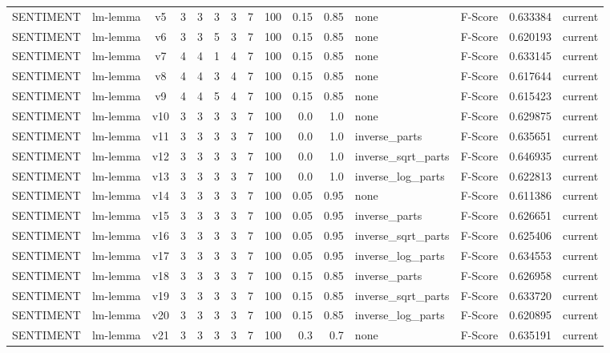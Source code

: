 \documentclass{article}
\begin{document}
\begin{xltabular}{\linewidth}{@{}lYcrrrrrrrrYlrl@{}}
SENTIMENT & lm-lemma & v5 & 3 & 3 & 3 & 3 & 7 & 100 & 0.15 & 0.85 & none & F-Score & 0.633384 & current \\
SENTIMENT & lm-lemma & v6 & 3 & 3 & 5 & 3 & 7 & 100 & 0.15 & 0.85 & none & F-Score & 0.620193 & current \\
SENTIMENT & lm-lemma & v7 & 4 & 4 & 1 & 4 & 7 & 100 & 0.15 & 0.85 & none & F-Score & 0.633145 & current \\
SENTIMENT & lm-lemma & v8 & 4 & 4 & 3 & 4 & 7 & 100 & 0.15 & 0.85 & none & F-Score & 0.617644 & current \\
SENTIMENT & lm-lemma & v9 & 4 & 4 & 5 & 4 & 7 & 100 & 0.15 & 0.85 & none & F-Score & 0.615423 & current \\
SENTIMENT & lm-lemma & v10 & 3 & 3 & 3 & 3 & 7 & 100 & 0.0 & 1.0 & none & F-Score & 0.629875 & current \\
SENTIMENT & lm-lemma & v11 & 3 & 3 & 3 & 3 & 7 & 100 & 0.0 & 1.0 & inverse\_parts & F-Score & 0.635651 & current \\
SENTIMENT & lm-lemma & v12 & 3 & 3 & 3 & 3 & 7 & 100 & 0.0 & 1.0 & inverse\_sqrt\_parts & F-Score & 0.646935 & current \\
SENTIMENT & lm-lemma & v13 & 3 & 3 & 3 & 3 & 7 & 100 & 0.0 & 1.0 & inverse\_log\_parts & F-Score & 0.622813 & current \\
SENTIMENT & lm-lemma & v14 & 3 & 3 & 3 & 3 & 7 & 100 & 0.05 & 0.95 & none & F-Score & 0.611386 & current \\
SENTIMENT & lm-lemma & v15 & 3 & 3 & 3 & 3 & 7 & 100 & 0.05 & 0.95 & inverse\_parts & F-Score & 0.626651 & current \\
SENTIMENT & lm-lemma & v16 & 3 & 3 & 3 & 3 & 7 & 100 & 0.05 & 0.95 & inverse\_sqrt\_parts & F-Score & 0.625406 & current \\
SENTIMENT & lm-lemma & v17 & 3 & 3 & 3 & 3 & 7 & 100 & 0.05 & 0.95 & inverse\_log\_parts & F-Score & 0.634553 & current \\
SENTIMENT & lm-lemma & v18 & 3 & 3 & 3 & 3 & 7 & 100 & 0.15 & 0.85 & inverse\_parts & F-Score & 0.626958 & current \\
SENTIMENT & lm-lemma & v19 & 3 & 3 & 3 & 3 & 7 & 100 & 0.15 & 0.85 & inverse\_sqrt\_parts & F-Score & 0.633720 & current \\
SENTIMENT & lm-lemma & v20 & 3 & 3 & 3 & 3 & 7 & 100 & 0.15 & 0.85 & inverse\_log\_parts & F-Score & 0.620895 & current \\
SENTIMENT & lm-lemma & v21 & 3 & 3 & 3 & 3 & 7 & 100 & 0.3 & 0.7 & none & F-Score & 0.635191 & current \\

\end{xltabular}
\end{document}
